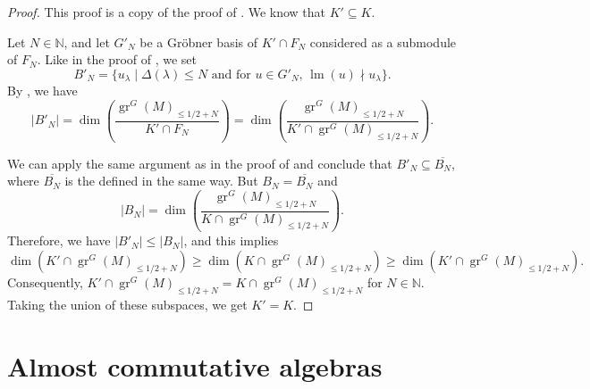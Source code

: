 \documentclass[a4paper, 12pt, reqno]{amsart}
\theoremstyle{remark}
\DeclareMathOperator{\gr}{gr}
\DeclareMathOperator{\lm}{lm}
\begin{document}
\begin{proof}
  This proof is a copy of the proof of .
  We know that $K' \subseteq K$.

  Let $N \in \mathbb{N}$, and let $G'_N$ be a Gröbner basis of $K' \cap F_N$ considered as a submodule of $F_N$.
  Like in the proof of , we set
  \begin{equation*}
    B'_N = \{u_{\lambda} \mid \text{$\Delta(\lambda) \le N$ and for $u \in G'_N$, $\lm(u) \nmid u_{\lambda}$}\}.
  \end{equation*}
  By \cite[Proposition 3.6.4]{adams_introduction_1994}, we have
  \begin{equation*}
    |B'_N| = \dim\left(\frac{\gr^G(M)_{\le 1/2 + N}}{K' \cap F_N}\right) = \dim\left(\frac{\gr^G(M)_{\le 1/2 + N}}{K' \cap \gr^G(M)_{\le 1/2 + N}}\right).
  \end{equation*}

  We can apply the same argument as in the proof of  and conclude that $B'_N \subseteq \overline{B_N}$, where $\overline{B_N}$ is the defined in the same way.
  But $B_N = \overline{B_N}$ and
  \begin{equation*}
    |B_N| = \dim\left(\frac{\gr^G(M)_{\le 1/2 + N}}{K \cap \gr^G(M)_{\le 1/2 + N}}\right).
  \end{equation*}
  Therefore, we have $|B'_N| \le |B_N|$, and this implies
  \begin{equation*}
    \dim(K' \cap \gr^G(M)_{\le 1/2 + N}) \ge \dim(K \cap \gr^G(M)_{\le 1/2 + N}) \ge \dim(K' \cap \gr^G(M)_{\le 1/2 + N}).
  \end{equation*}
  Consequently, $K' \cap \gr^G(M)_{\le 1/2 + N} = K \cap \gr^G(M)_{\le 1/2 + N}$ for $N \in \mathbb{N}$.
  Taking the union of these subspaces, we get $K' = K$.
\end{proof}

\appendix
\section{Almost commutative algebras}
\label{sec:almost-comm-algebr}
\end{document}
